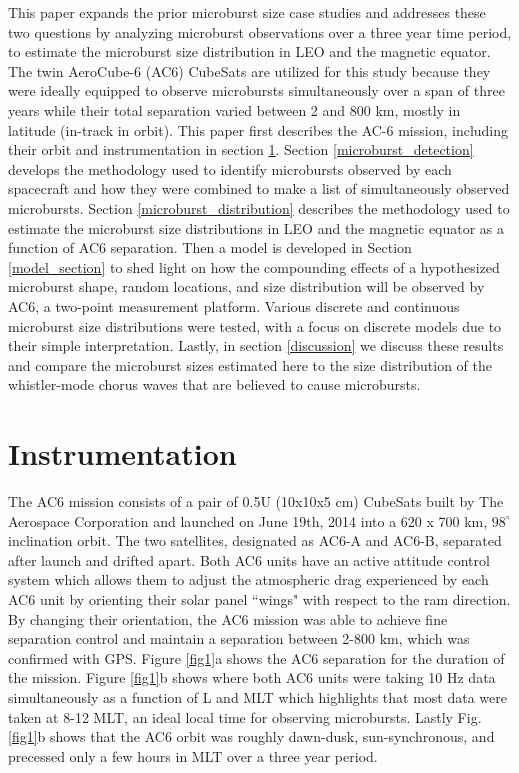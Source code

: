 \documentclass[draft]{agujournal2019}
\begin{document}
This paper expands the prior microburst size case studies and addresses these two questions by analyzing microburst observations over a three year time period, to estimate the microburst size distribution in LEO and the magnetic equator. The twin AeroCube-6 (AC6) CubeSats are utilized for this study because they were ideally equipped to observe microbursts simultaneously over a span of three years while their total separation varied between 2 and 800 km, mostly in latitude (in-track in orbit). This paper first describes the AC-6 mission, including their orbit and instrumentation in section \ref{instrumentation}. Section \ref{microburst_detection} develops the methodology used to identify microbursts observed by each spacecraft and how they were combined to make a list of simultaneously observed microbursts. Section \ref{microburst_distribution} describes the methodology used to estimate the microburst size distributions in LEO and the magnetic equator as a function of AC6 separation. Then a model is developed in Section \ref{model_section} to shed light on how the compounding effects of a hypothesized microburst shape, random locations, and size distribution will be observed by AC6, a two-point measurement platform. Various discrete and continuous microburst size distributions were tested, with a focus on discrete models due to their simple interpretation. Lastly, in section \ref{discussion} we discuss these results and compare the microburst sizes estimated here to the size distribution of the whistler-mode chorus waves that are believed to cause microbursts. 

\section{Instrumentation} \label{instrumentation}
The AC6 mission consists of a pair of 0.5U (10x10x5 cm) CubeSats built by The Aerospace Corporation and launched on June 19th, 2014 into a 620 x 700 km, $98^\circ$ inclination orbit. The two satellites, designated as AC6-A and AC6-B, separated after launch and drifted apart. Both AC6 units have an active attitude control system which allows them to adjust the atmospheric drag experienced by each AC6 unit by orienting their solar panel ``wings" with respect to the ram direction. By changing their orientation, the AC6 mission was able to achieve fine separation control and maintain a separation between 2-800 km, which was confirmed with GPS. Figure \ref{fig1}a shows the AC6 separation for the duration of the mission. Figure \ref{fig1}b shows where both AC6 units were taking 10 Hz data simultaneously as a function of L and MLT which highlights that most data were taken at 8-12 MLT, an ideal local time for observing microbursts. Lastly Fig. \ref{fig1}b shows that the AC6 orbit was roughly dawn-dusk, sun-synchronous, and precessed only a few hours in MLT over a three year period.
\end{document}
